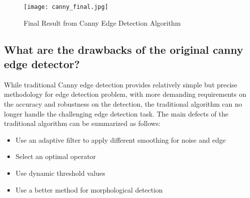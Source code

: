 \begin{figure}[!htb]
    \centering
    \texttt{[image: canny\_final.jpg]}
    \caption{Final Result from Canny Edge Detection Algorithm}
\end{figure}




\subsection{What are the drawbacks of the original canny edge detector?}
While traditional Canny edge detection provides relatively simple but precise methodology for edge detection problem, with more demanding requirements on the accuracy and robustness on the detection, the traditional algorithm can no longer handle the challenging edge detection task. The main defects of the traditional algorithm can be summarized as follows:

\begin{itemize}
    \item Use an adaptive filter to apply different smoothing for noise and edge
    \item Select an optimal operator
    \item Use dynamic threshold values
    \item Use a better method for morphological detection
\end{itemize}

\cite{zhou11}

